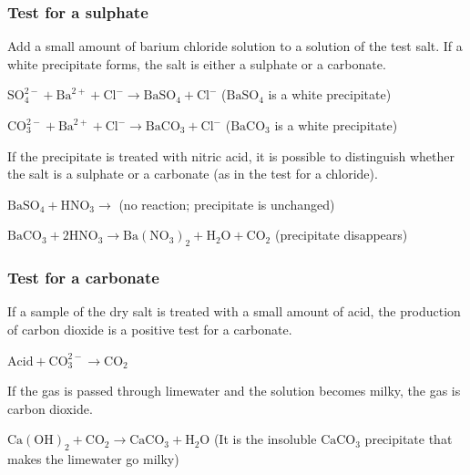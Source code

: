             \subsubsection{ Test for a sulphate}
            \nopagebreak
        \label{m38719*id341449}Add a small amount of barium chloride solution to a solution of the test salt. If a white precipitate forms, the salt is either a sulphate or a carbonate.\par 
        \label{m38719*id341454}$\mathrm{SO}_{4}^{2-}+{\mathrm{Ba}}^{2+}+{\mathrm{Cl}}^{-}\to {\mathrm{BaSO}}_{4}+{\mathrm{Cl}}^{-}$ (${\mathrm{BaSO}}_{4}$ is a white precipitate)\par 
        \label{m38719*id341538}$\mathrm{CO}_{3}^{2-}+{\mathrm{Ba}}^{2+}+{\mathrm{Cl}}^{-}\to {\mathrm{BaCO}}_{3}+{\mathrm{Cl}}^{-}$ (${\mathrm{BaCO}}_{3}$ is a white precipitate)\par 
        \label{m38719*id341622}If the precipitate is treated with nitric acid, it is possible to distinguish whether the salt is a sulphate or a carbonate (as in the test for a chloride).\par 
        \label{m38719*id341627}${\mathrm{BaSO}}_{4}+{\mathrm{HNO}}_{3}\to $ (no reaction; precipitate is unchanged)\par 
        \label{m38719*id341658}${\mathrm{BaCO}}_{3}+2{\mathrm{HNO}}_{3}\to \mathrm{Ba}{\left({\mathrm{NO}}_{3}\right)}_{2}+{\mathrm{H}}_{2}\mathrm{O}+{\mathrm{CO}}_{2}$ (precipitate disappears)\par 
      \label{m38719*uid72}
            \subsubsection{ Test for a carbonate}
            \nopagebreak
        \label{m38719*id341749}If a sample of the dry salt is treated with a small amount of acid, the production of carbon dioxide is a positive test for a carbonate.\par 
        \label{m38719*id341754}$\mathrm{Acid}+\mathrm{CO}_{3}^{2-}\to {\mathrm{CO}}_{2}$\par 
        \label{m38719*id341796}If the gas is passed through limewater and the solution becomes milky, the gas is carbon dioxide.\par 
        \label{m38719*id341800}${\mathrm{Ca\left(OH\right)}}_{2}+{\mathrm{CO}}_{2}\to {\mathrm{CaCO}}_{3}+\mathrm{H}{}_{2}\mathrm{O}$ (It is the insoluble ${\mathrm{CaCO}}_{3}$ precipitate that makes the limewater go milky)\par 
      \label{m38719*uid73}
